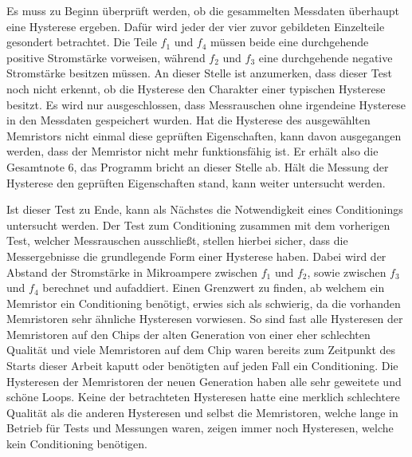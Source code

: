 Es muss zu Beginn überprüft werden, ob die gesammelten Messdaten überhaupt eine Hysterese ergeben. Dafür wird jeder der vier zuvor gebildeten Einzelteile gesondert betrachtet. Die Teile $f_1$ und $f_4$ müssen beide eine durchgehende positive Stromstärke vorweisen, während $f_2$ und $f_3$ eine durchgehende negative Stromstärke besitzen müssen. An dieser Stelle ist anzumerken, dass dieser Test noch nicht erkennt, ob die Hysterese den Charakter einer typischen Hysterese besitzt. Es wird nur ausgeschlossen, dass Messrauschen ohne irgendeine Hysterese in den Messdaten gespeichert wurden. Hat die Hysterese des ausgewählten Memristors nicht einmal diese geprüften Eigenschaften, kann davon ausgegangen werden, dass der Memristor nicht mehr funktionsfähig ist. Er erhält also die Gesamtnote 6, das Programm bricht an dieser Stelle ab. Hält die Messung der Hysterese den geprüften Eigenschaften stand, kann weiter untersucht werden.

Ist dieser Test zu Ende, kann als Nächstes die Notwendigkeit eines Conditionings untersucht werden. Der Test zum Conditioning zusammen mit dem vorherigen Test, welcher Messrauschen ausschließt, stellen hierbei sicher, dass die Messergebnisse die grundlegende Form einer Hysterese haben. Dabei wird der Abstand der Stromstärke in Mikroampere zwischen $f_1$ und $f_2$, sowie zwischen $f_3$ und $f_4$ berechnet und aufaddiert. Einen Grenzwert zu finden, ab welchem ein Memristor ein Conditioning benötigt, erwies sich als schwierig, da die vorhanden Memristoren sehr ähnliche Hysteresen vorwiesen. So sind fast alle Hysteresen der Memristoren auf den Chips der alten Generation von einer eher schlechten Qualität und viele Memristoren auf dem Chip waren bereits zum Zeitpunkt des Starts dieser Arbeit kaputt oder benötigten auf jeden Fall ein Conditioning. Die Hysteresen der Memristoren der neuen Generation haben alle sehr geweitete und schöne Loops. Keine der betrachteten Hysteresen hatte eine merklich schlechtere Qualität als die anderen Hysteresen und selbst die Memristoren, welche lange in Betrieb für Tests und Messungen waren, zeigen immer noch Hysteresen, welche kein Conditioning benötigen.

